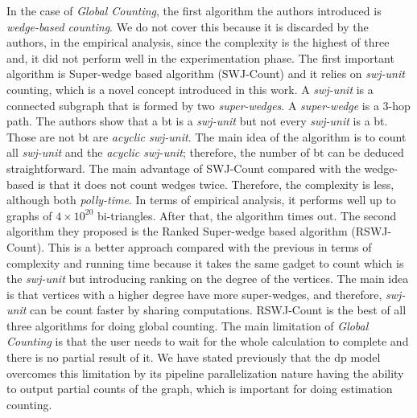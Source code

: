 In the case of \emph{Global Counting}, the first algorithm the authors introduced is \emph{wedge-based counting}. We do not cover this because it is discarded
by the authors, in the empirical analysis, since the complexity is the highest of three and, it did not perform well in the experimentation phase.
The first important algorithm is Super-wedge based algorithm (SWJ-Count) and it relies on \emph{swj-unit} counting, which is a novel concept introduced in this work. A \emph{swj-unit} is a connected subgraph that is formed by two \emph{super-wedges}. A \emph{super-wedge}
is a 3-hop path. The authors show that a \acrshort{bt} is a \emph{swj-unit} but not every \emph{swj-unit} is a \acrshort{bt}. Those 
are not \acrshort{bt} are \emph{acyclic swj-unit}. The main idea of the algorithm is to count all \emph{swj-unit} and the \emph{acyclic swj-unit}; therefore,
the number of \acrshort{bt} can be deduced straightforward.
The main advantage of SWJ-Count compared with the wedge-based is that it does not count wedges twice.
Therefore, the complexity is less, although both \emph{polly-time}.
In terms of empirical analysis, it performs well up to graphs of $4 \times 10^20$ bi-triangles. After that, the algorithm times out.
The second algorithm they proposed is the Ranked Super-wedge based algorithm (RSWJ-Count). This is a better approach compared with the previous in terms of complexity and running time because it takes the same gadget to count which is the \emph{swj-unit} but introducing ranking on the degree of the vertices. The main idea is that vertices with a higher degree have more super-wedges, 
and therefore, \emph{swj-unit} can be count faster by sharing computations. RSWJ-Count is the best of all three algorithms for doing global counting.
The main limitation of \emph{Global Counting} is that the user needs to wait for the whole calculation to complete and there is no partial result of it.
We have stated previously that the  \acrshort{dp} model overcomes this limitation by its pipeline parallelization nature having the ability to output partial counts of the graph, which is important for doing estimation counting.


